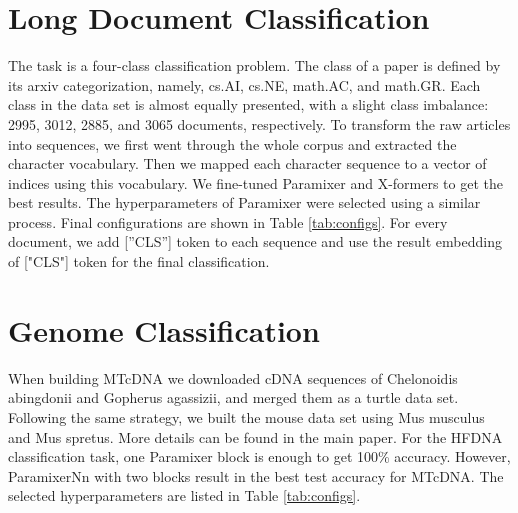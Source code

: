 \documentclass{article}
\begin{document}
\section{Long Document Classification}
The task is a four-class classification problem. The class of a paper is defined by its arxiv categorization, namely, cs.AI, cs.NE, math.AC, and math.GR. Each class in the data set is almost equally presented, with a slight class imbalance: 2995, 3012, 2885, and 3065 documents, respectively. To transform the raw articles into sequences, we first went through the whole corpus and extracted the character vocabulary. Then we mapped each character sequence to a vector of indices using this vocabulary. We fine-tuned Paramixer and X-formers to get the best results. The hyperparameters of Paramixer were selected using a similar process. Final configurations are shown in Table \ref{tab:configs}. For every document, we add [”CLS”] token to each sequence and use the result embedding of ["CLS"] token for the final classification.

\section{Genome Classification}
When building MTcDNA we downloaded cDNA sequences of Chelonoidis abingdonii and Gopherus agassizii, and merged them as a turtle data set. Following the same strategy, we built the mouse data set using Mus musculus and Mus spretus. More details can be found in the main paper. For the HFDNA classification task, one Paramixer block is enough to get 100\% accuracy. However, ParamixerNn with two blocks result in the best test accuracy for MTcDNA. The selected hyperparameters are listed in Table \ref{tab:configs}. 
\end{document}
